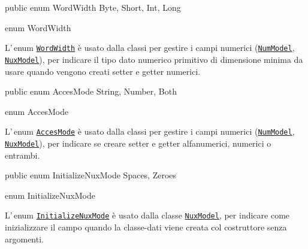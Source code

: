 \documentclass[a4paper,10pt]{report}
\newif\ifesource
\newenvironment{elisting}[1][H]
  {\captionsetup{aboveskip=0pt}\begin{listing}[#1]}
  {\end{listing}%
}
\begin{document}
\ifesource
\begin{lstlisting}[language=java, 
caption=enum WordWidth, 
label=lst:WordWidth]
public enum WordWidth { Byte, Short, Int, Long }
\end{lstlisting}\index{WordWidth}
\else
\begin{elisting}
\begin{javacode}
public enum WordWidth { Byte, Short, Int, Long }
\end{javacode}
\caption{enum WordWidth}\label{lst:WordWidth}
\end{elisting}
\fi
L'\,enum \hyperref[lst:WordWidth]{\texttt{WordWidth}} è usato 
dalla classi per gestire i campi numerici 
(\hyperref[lst:NumModel]{\texttt{NumModel}},
\hyperref[lst:NuxModel]{\texttt{NuxModel}}), per indicare il tipo dato numerico
primitivo di dimensione minima da usare quando vengono creati setter e getter
numerici.

\ifesource
\begin{lstlisting}[language=java, 
caption=enum AccesMode, 
label=lst:AccesMode]
public enum AccesMode { String, Number, Both }
\end{lstlisting}\index{AccesMode}
\else
\begin{elisting}
\begin{javacode}
public enum AccesMode { String, Number, Both }
\end{javacode}
\caption{enum AccesMode}\label{lst:AccesMode}
\end{elisting}
\fi
L'\,enum \hyperref[lst:AccesMode]{\texttt{AccesMode}} è usato 
dalla classi per gestire i campi numerici 
(\hyperref[lst:NumModel]{\texttt{NumModel}},
\hyperref[lst:NuxModel]{\texttt{NuxModel}}), per indicare se creare setter e
getter alfanumerici, numerici o entrambi.


\ifesource
\begin{lstlisting}[language=java, 
caption=enum InitializeNuxMode, 
label=lst:InitializeNuxMode]
public enum InitializeNuxMode { Spaces, Zeroes }
\end{lstlisting}\index{InitializeNuxMode}
\else
\begin{elisting}
\begin{javacode}
public enum InitializeNuxMode { Spaces, Zeroes }
\end{javacode}
\caption{enum InitializeNuxMode}\label{lst:InitializeNuxMode}
\end{elisting}
\fi
L'\,enum \hyperref[lst:InitializeNuxMode]{\texttt{InitializeNuxMode}} è usato 
dalla classe \hyperref[lst:NuxModel]{\texttt{NuxModel}}, per indicare come 
inizializzare il campo quando la classe-dati viene creata col costruttore senza
argomenti.
\end{document}

